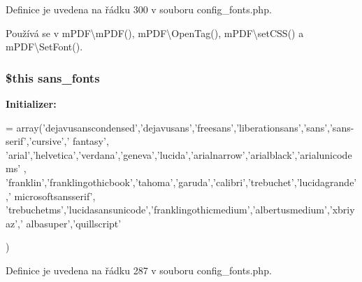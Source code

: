 Definice je uvedena na řádku 300 v souboru config\-\_\-fonts.\-php.



Používá se v m\-P\-D\-F\textbackslash{}m\-P\-D\-F(), m\-P\-D\-F\textbackslash{}\-Open\-Tag(), m\-P\-D\-F\textbackslash{}set\-C\-S\-S() a m\-P\-D\-F\textbackslash{}\-Set\-Font().

\hypertarget{config__fonts_8php_ac4f4a6e2648cc43b33ef4a97b080ece2}{
\subsubsection[{sans\-\_\-fonts}]{\setlength{\rightskip}{0pt plus 5cm}\$this sans\-\_\-fonts}}\label{config__fonts_8php_ac4f4a6e2648cc43b33ef4a97b080ece2}
{\bfseries Initializer\-:}
\begin{DoxyCode}
= array(\textcolor{stringliteral}{'dejavusanscondensed'},\textcolor{stringliteral}{'dejavusans'},\textcolor{stringliteral}{'freesans'},\textcolor{stringliteral}{'liberationsans'},\textcolor{stringliteral}{'sans'},\textcolor{stringliteral}{'sans-serif'},\textcolor{stringliteral}{'cursive'},\textcolor{stringliteral}{'
      fantasy'}, 
                \textcolor{stringliteral}{'arial'},\textcolor{stringliteral}{'helvetica'},\textcolor{stringliteral}{'verdana'},\textcolor{stringliteral}{'geneva'},\textcolor{stringliteral}{'lucida'},\textcolor{stringliteral}{'arialnarrow'},\textcolor{stringliteral}{'arialblack'},\textcolor{stringliteral}{'arialunicodems'}
      ,
                \textcolor{stringliteral}{'franklin'},\textcolor{stringliteral}{'franklingothicbook'},\textcolor{stringliteral}{'tahoma'},\textcolor{stringliteral}{'garuda'},\textcolor{stringliteral}{'calibri'},\textcolor{stringliteral}{'trebuchet'},\textcolor{stringliteral}{'lucidagrande'},\textcolor{stringliteral}{'
      microsoftsansserif'},
                \textcolor{stringliteral}{'trebuchetms'},\textcolor{stringliteral}{'lucidasansunicode'},\textcolor{stringliteral}{'franklingothicmedium'},\textcolor{stringliteral}{'albertusmedium'},\textcolor{stringliteral}{'xbriyaz'},\textcolor{stringliteral}{'
      albasuper'},\textcolor{stringliteral}{'quillscript'}

)
\end{DoxyCode}


Definice je uvedena na řádku 287 v souboru config\-\_\-fonts.\-php.



